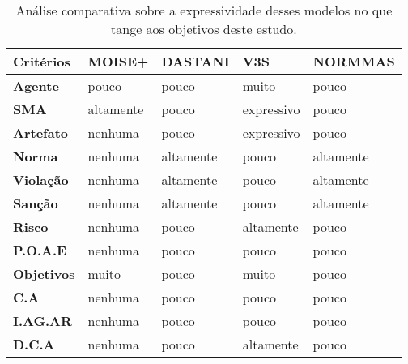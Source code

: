 \begin{table}[H]
    \centering
    \begin{tabular}{|l|l|l|l|l|}
        \hline
        \textbf{Critérios} & \textbf{MOISE+}        & \textbf{DASTANI}     & \textbf{V3S}         & \textbf{NORMMAS}          \\ \hline
        \textbf{Agente}    & pouco                  & pouco                & muito                & pouco                     \\ \hline
        \textbf{SMA}       & altamente              & pouco                & expressivo           & pouco                     \\ \hline
        \textbf{Artefato}  & nenhuma                & pouco                & expressivo           & pouco                     \\ \hline
        \textbf{Norma}     & nenhuma                & altamente            & pouco                & altamente                 \\ \hline
        \textbf{Violação}  & nenhuma                & altamente            & pouco                & altamente                 \\ \hline
        \textbf{Sanção}    & nenhuma                & altamente            & pouco                & altamente                 \\ \hline
        \textbf{Risco}     & nenhuma                & pouco                & altamente            & pouco                     \\ \hline
        \textbf{P.O.A.E}   & nenhuma                & pouco                & pouco                & pouco                     \\ \hline
        \textbf{Objetivos} & muito                  & pouco                & muito                & pouco                     \\ \hline
        \textbf{C.A}       & nenhuma                & pouco                & pouco                & pouco                     \\ \hline
        \textbf{I.AG.AR}   & nenhuma                & pouco                & pouco                & pouco                    \\ \hline
        \textbf{D.C.A}     & nenhuma                & pouco                & altamente            & pouco 
    \\ \hline
    \end{tabular}
    \caption{Análise comparativa sobre a expressividade desses modelos no que tange aos objetivos deste estudo.}
    \label{comparemodel}
\end{table}

